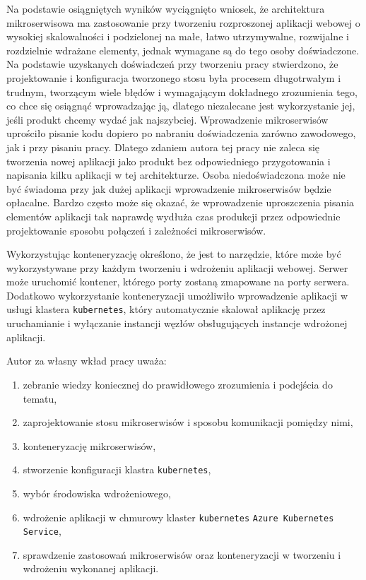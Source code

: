 \documentclass[12pt,twoside]{article}
\begin{document}
Na podstawie osiągniętych wyników wyciągnięto wniosek, że architektura mikroserwisowa ma zastosowanie przy tworzeniu rozproszonej aplikacji webowej o wysokiej skalowalności i podzielonej na małe, łatwo utrzymywalne, rozwijalne i rozdzielnie wdrażane elementy, jednak wymagane są do tego osoby doświadczone. Na podstawie uzyskanych doświadczeń przy tworzeniu pracy stwierdzono, że projektowanie i konfiguracja tworzonego stosu była procesem długotrwałym i trudnym, tworzącym wiele błędów i wymagającym dokładnego zrozumienia tego, co chce się osiągnąć wprowadzając ją, dlatego niezalecane jest wykorzystanie jej, jeśli produkt chcemy wydać jak najszybciej. Wprowadzenie mikroserwisów uprościło pisanie kodu dopiero po nabraniu doświadczenia zarówno zawodowego, jak i przy pisaniu pracy. Dlatego zdaniem autora tej pracy nie zaleca się tworzenia nowej aplikacji jako produkt bez odpowiedniego przygotowania i napisania kilku aplikacji w tej architekturze. Osoba niedoświadczona może nie być świadoma przy jak dużej aplikacji wprowadzenie mikroserwisów będzie opłacalne. Bardzo często może się okazać, że wprowadzenie uproszczenia pisania elementów aplikacji tak naprawdę wydłuża czas produkcji przez odpowiednie projektowanie sposobu połączeń i zależności mikroserwisów.

Wykorzystując konteneryzację określono, że jest to narzędzie, które może być wykorzystywane przy każdym tworzeniu i wdrożeniu aplikacji webowej. Serwer może uruchomić kontener, którego porty zostaną zmapowane na porty serwera. Dodatkowo wykorzystanie konteneryzacji umożliwiło wprowadzenie aplikacji w usługi klastera \texttt{kubernetes}, który automatycznie skalował aplikację przez uruchamianie i wyłączanie instancji węzłów obsługujących instancje wdrożonej aplikacji.

Autor za własny wkład pracy uważa:
\begin{enumerate}[label=\arabic*), leftmargin=1.25cm]
\item zebranie wiedzy koniecznej do prawidłowego zrozumienia i podejścia do tematu,
\item zaprojektowanie stosu mikroserwisów i sposobu komunikacji pomiędzy nimi,
\item konteneryzację mikroserwisów,
\item stworzenie konfiguracji klastra \texttt{kubernetes},
\item wybór środowiska wdrożeniowego,
\item wdrożenie aplikacji w chmurowy klaster \texttt{kubernetes} \texttt{Azure Kubernetes Service},
\item sprawdzenie zastosowań mikroserwisów oraz konteneryzacji w tworzeniu i wdrożeniu wykonanej aplikacji.
\end{enumerate}
\end{document}

